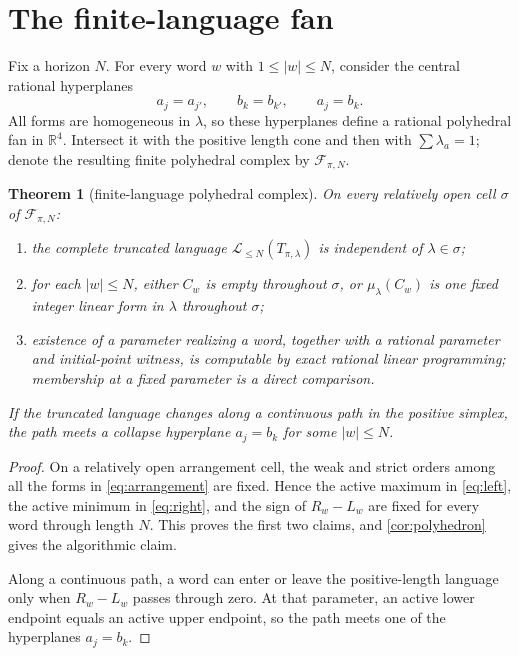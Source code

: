 \documentclass[11pt,a4paper]{amsart}
\newtheorem{theorem}{Theorem}[section]
\theoremstyle{definition}
\theoremstyle{remark}
\newcommand{\cL}{\mathcal L}
\newcommand{\cF}{\mathcal F}
\newcommand{\R}{\mathbb R}
\begin{document}
\section{The finite-language fan}

Fix a horizon $N$.  For every word $w$ with $1\leq|w|\leq N$, consider the
central rational hyperplanes
\begin{equation}\label{eq:arrangement}
 a_j=a_{j'},\qquad b_k=b_{k'},\qquad a_j=b_k.
\end{equation}
All forms are homogeneous in $\lambda$, so these hyperplanes define a rational
polyhedral fan in $\R^4$.  Intersect it with the positive length cone and then
with $\sum\lambda_a=1$; denote the resulting finite polyhedral complex by
$\cF_{\pi,N}$.

\begin{theorem}[finite-language polyhedral complex]\label{thm:fan}
On every relatively open cell $\sigma$ of $\cF_{\pi,N}$:
\begin{enumerate}
\item the complete truncated language
$\cL_{\leq N}(T_{\pi,\lambda})$ is independent of
$\lambda\in\sigma$;
\item for each $|w|\leq N$, either $C_w$ is empty throughout $\sigma$, or
$\mu_\lambda(C_w)$ is one fixed integer linear form in $\lambda$ throughout
$\sigma$;
\item existence of a parameter realizing a word, together with a rational
parameter and initial-point witness, is computable by exact rational linear
programming; membership at a fixed parameter is a direct comparison.
\end{enumerate}
If the truncated language changes along a continuous path in the positive
simplex, the path meets a collapse hyperplane $a_j=b_k$ for some
$|w|\leq N$.
\end{theorem}

\begin{proof}
On a relatively open arrangement cell, the weak and strict orders among all
the forms in \eqref{eq:arrangement} are fixed.  Hence the active maximum in
\eqref{eq:left}, the active minimum in \eqref{eq:right}, and the sign of
$R_w-L_w$ are fixed for every word through length $N$.  This proves the first
two claims, and \cref{cor:polyhedron} gives the algorithmic claim.

Along a continuous path, a word can enter or leave the positive-length
language only when $R_w-L_w$ passes through zero.  At that parameter, an
active lower endpoint equals an active upper endpoint, so the path meets one
of the hyperplanes $a_j=b_k$.
\end{proof}
\end{document}
